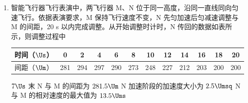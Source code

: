 \documentclass[\gkver]{gaokaozhenti}
\begin{document}
\begin{enumerate}
{D．由题图~\ref{2026河南09b} 可知，Q 点对应的电压为负，即由题意可知此时 b 点电势低于 a 点电势，线圈中的感应电流由 b 到 a，通过线圈的感应磁场方向向右，若 Q 点对应呼气，则线圈中的原磁场减弱，即原磁场方向应向右，磁性薄膜的 S 极应在左侧，故 D 错误。

故选 BC。
}

\item
智能飞行器飞行表演中，两飞行器 M、N 位于同一高度，沿同一直线同向匀速飞行。依据表演要求，M 保持飞行速度不变，N 先匀加速后匀减速调整与 M 的间距，20 s 以内完成调整。从开始调整时计时，N 传回的数据如表所示，则调整过程中 

\begin{center}
{\footnotesize\setlength{\tabcolsep}{3pt}
\begin{tabular}{|c|ccccccccccc|}
\hline
时间（$\Us$） & 0 & 2 & 4 & 6 & 8 & 10 & 12 & 14 & 16 & 18 & 20 \\
\hline
间距（$\Um$） & 281 & 294 & 297 & 290 & 273 & 248 & 227 & 212 & 203 & 200 & 200 \\
\hline
\end{tabular}}
\end{center}

{$7\Us$ 末 N 与 M 的间距为 $281.5\Um$}
{N 加速阶段的加速度大小为 $2.5\Umsq$}
{N 与 M 的相对速度的最大值为 $13.5\Ums$}

\end{enumerate}
\end{document}

